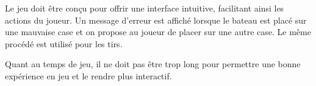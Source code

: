 \documentclass[../besoin_user.tex]{subfiles}
\begin{document}
Le jeu doit être conçu pour offrir une interface intuitive, facilitant ainsi les actions du joueur.
Un message d'erreur est affiché lorsque le bateau est placé sur une mauvaise case et on 
propose au joueur de placer sur une autre case. 
Le même procédé est utilisé pour les tirs.

Quant au temps de jeu, il ne doit pas être trop long pour permettre une bonne expérience en jeu et le rendre plus interactif.
\end{document}

